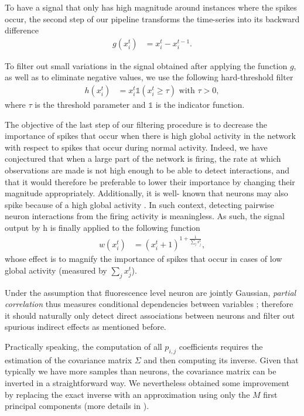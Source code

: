 \documentclass[wcp]{jmlr}
\begin{document}
To have a signal that only has high magnitude around instances where the spikes occur, the second step of our pipeline transforms the time-series into its backward difference
\begin{align}
g(x^{t}_{i}) &= x^{t}_i - x^{t-1}_i. \label{eq:high-pass-filter}
\end{align}

To filter out small variations in the signal obtained after applying the
function $g$, as well as to eliminate negative values, we use the following
hard-threshold filter
\begin{align}\label{eqn:hfilter}
h(x^{t}_i) &= x^{t}_i \mathbb{1}(x^{t}_i \geq \tau) \text{ with } \tau > 0,
\end{align}
where $\tau$ is the threshold parameter and $\mathbb{1}$ is the indicator
function.

The objective of the last step of our filtering procedure is to decrease the
importance of spikes that occur when there is high global activity in the
network with respect to spikes that occur during normal activity. Indeed, we
have conjectured that when a large part of the network is firing, the rate at
which observations are made is not high enough to be able to detect
interactions, and that it would therefore be preferable to lower their
importance by changing their magnitude appropriately. Additionally, it is well-
known that neurons may also spike because of a high global activity
\citep{stetter2012model}. In such context, detecting pairwise neuron
interactions from the firing activity is meaningless. As such, the signal
output by h is finally applied to the following function
\begin{align}
 w(x^{t}_i) &= (x^{t}_i + 1 )^{1 + \frac{1}{\sum_{j} x^{t}_j}}, \label{eq:magnify-filter}
\end{align}
whose effect is to magnify the importance of spikes that occur in cases of low
global activity (measured by $\sum_j x^t_j$).

Under the assumption that fluorescence level neuron are jointly Gaussian,
\textit{partial correlation} thus measures conditional dependencies between
variables ; therefore it should naturally only detect direct associations
between neurons and filter out spurious indirect effects as mentioned before.

Practically speaking, the computation of all $p_{i,j}$ coefficients requires
the estimation of the covariance matrix $\Sigma$ and then computing its
inverse. Given that typically we have more samples than neurons, the covariance
matrix can be inverted in a straightforward way. We nevertheless obtained some
improvement by replacing the exact inverse with an approximation using only the
$M$ first principal components \citep{bishop2006pattern} (more details in
\citep{sutera2014simple}).
\end{document}

